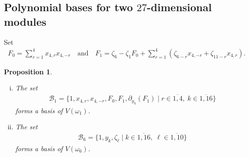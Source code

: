 \documentclass[12pt]{article}
\numberwithin{equation}{section}
\newtheorem{proposition}[theorem]{Proposition}
\theoremstyle{definition}
\theoremstyle{remark}
\begin{document}
\subsection{Polynomial bases for two $27$-dimensional modules}
Set
\begin{eqnarray}
	F_0=\sum_{r=1}^4x_{4,r}x_{4,-r}\quad\text{and}\quad
	F_1=\zeta_6-\zeta_1F_0+\sum_{r=1}^{4}(\zeta_{6-r}x_{4,-r}+\zeta_{11-r}x_{4,r}). \label{4.10}
\end{eqnarray}
\begin{proposition}\label{prop4.5}
	\begin{enumerate}[(i)]
		\item The set
		\begin{align}
			\mathcal{B}_1=\{1,x_{4,r},x_{4,-r},F_0,F_1,\partial_{y_k}(F_1)\mid r\in\overline{1,4},\;k\in\overline{1,16}\} \label{4,10}
		\end{align}
		forms a basis of $V(\omega_1)$.
		\item The set
		\begin{eqnarray}
			\mathcal{B}_6=\{1,y_k,\zeta_{\ell}\mid k\in\overline{1,16},\;\ell\in\overline{1,10}\} \label{b60}
		\end{eqnarray}
		forms a basis of $V(\omega_6)$.
	\end{enumerate}	
\end{proposition}
\end{document}
